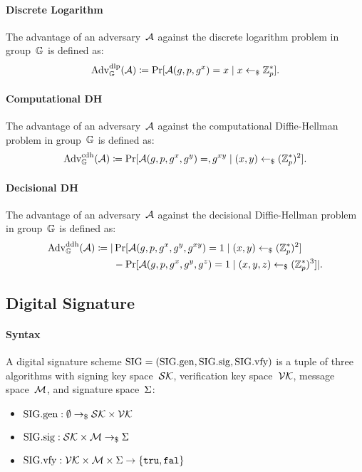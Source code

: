 \documentclass[a4paper,orivec]{llncs}
\begin{document}
\paragraph{Discrete Logarithm}
The advantage of an adversary~$\mathcal{A}$ against the discrete logarithm problem in group~$\mathbb{G}$ is defined as:
\[
\mathrm{Adv}_{\mathbb{G}}^{\mathrm{dlp}}(\mathcal{A})\coloneqq\Pr[\mathcal{A}(g,p,g^x)=x\mid x\gets_\$\mathbb{Z}_p^*]\text{.}
\]


\paragraph{Computational DH}
The advantage of an adversary~$\mathcal{A}$ against the computational Diffie-Hellman problem in group~$\mathbb{G}$ is defined as:
\[
\mathrm{Adv}_{\mathbb{G}}^{\mathrm{cdh}}(\mathcal{A})\coloneqq\Pr[\mathcal{A}(g,p,g^x,g^y)=,g^{xy}\mid (x,y)\gets_\$(\mathbb{Z}_p^*)^2]\text{.}
\]

\paragraph{Decisional DH}
The advantage of an adversary~$\mathcal{A}$ against the decisional Diffie-Hellman problem in group~$\mathbb{G}$ is defined as:
\begin{align*}
    \mathrm{Adv}_{\mathbb{G}}^{\mathrm{ddh}}(\mathcal{A})\coloneqq|&\Pr[\mathcal{A}(g,p,g^x,g^y,g^{xy})=1\mid (x,y)\gets_\$(\mathbb{Z}_p^*)^2]\\
    &-\Pr[\mathcal{A}(g,p,g^x,g^y,g^z)=1\mid (x,y,z)\gets_\$(\mathbb{Z}_p^*)^3]|\text{.}
\end{align*}

\subsection{Digital Signature}

\paragraph{Syntax}
A digital signature scheme $\mathrm{SIG}=(\mathrm{SIG}.\mathrm{gen},\mathrm{SIG}.\mathrm{sig},\mathrm{SIG}.\mathrm{vfy})$ is a tuple of three algorithms with signing key space~$\mathcal{SK}$, verification key space~$\mathcal{VK}$, message space~$\mathcal{M}$, and signature space~$\Sigma$:

\begin{itemize}
    \item $\mathrm{SIG}.\mathrm{gen}: \emptyset \to_\$ \mathcal{SK}\times\mathcal{VK}$
    \item $\mathrm{SIG}.\mathrm{sig}: \mathcal{SK}\times\mathcal{M} \to_\$ \Sigma$
    \item $\mathrm{SIG}.\mathrm{vfy}: \mathcal{VK}\times\mathcal{M}\times\Sigma \to \{\mathtt{tru},\mathtt{fal}\}$
\end{itemize}
\end{document}

